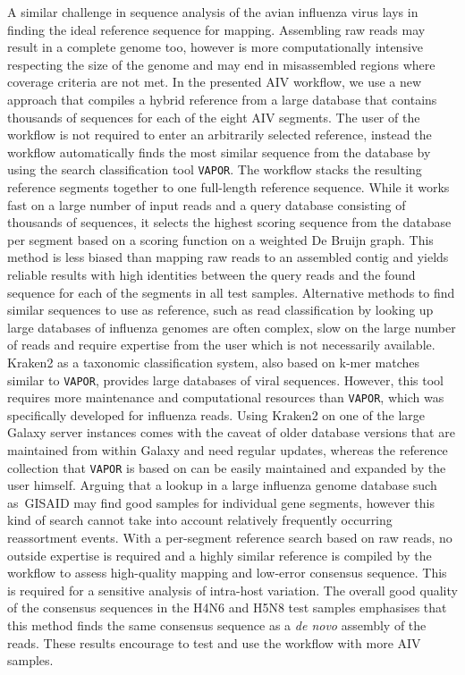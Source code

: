 A similar challenge in sequence analysis of the avian influenza virus lays in finding the ideal reference sequence for mapping. Assembling raw reads may result in a complete genome too, however is more computationally intensive respecting the size of the genome and may end in misassembled regions where coverage criteria are not met. In the presented \ac{AIV} workflow, we use a new approach that compiles a hybrid reference from a large database that contains thousands of sequences for each of the eight \ac{AIV} segments. The user of the workflow is not required to enter an arbitrarily selected reference, instead the workflow automatically finds the most similar sequence from the database by using the search classification tool \texttt{VAPOR}. The workflow stacks the resulting reference segments together to one full-length reference sequence. While it works fast on a large number of input reads and a query database consisting of thousands of sequences, it selects the highest scoring sequence from the database per segment based on a scoring function on a weighted De Bruijn graph. This method is less biased than mapping raw reads to an assembled contig and yields reliable results with high identities between the query reads and the found sequence for each of the segments in all test samples. Alternative methods to find similar sequences to use as reference, such as read classification by looking up large databases of influenza genomes are often complex, slow on the large number of reads and require expertise from the user which is not necessarily available. Kraken2 as a taxonomic classification system, also based on k-mer matches similar to \texttt{VAPOR}, provides large databases of viral sequences. However, this tool requires more maintenance and computational resources than \texttt{VAPOR}, which was specifically developed for influenza reads. Using Kraken2 on one of the large Galaxy server instances comes with the caveat of older database versions that are maintained from within Galaxy and need regular updates, whereas the reference collection that \texttt{VAPOR} is based on can be easily maintained and expanded by the user himself. Arguing that a lookup in a large influenza genome database such as~\ac{GISAID} may find good samples for individual gene segments, however this kind of search cannot take into account relatively frequently occurring reassortment events. With a per-segment reference search based on raw reads, no outside expertise is required and a highly similar reference is compiled by the workflow to assess high-quality mapping and low-error consensus sequence. This is required for a sensitive analysis of intra-host variation. The overall good quality of the consensus sequences in the H4N6 and H5N8 test samples emphasises that this method finds the same consensus sequence as a \textit{de novo} assembly of the reads. These results encourage to test and use the workflow with more \ac{AIV} samples.\\
